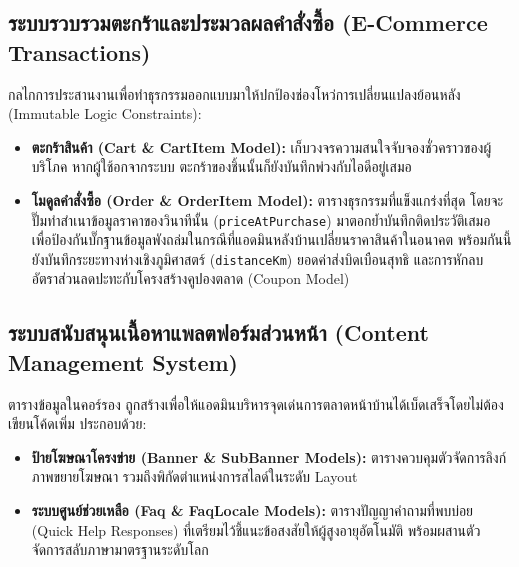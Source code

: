 \subsection{ระบบรวบรวมตะกร้าและประมวลผลคำสั่งซื้อ (E-Commerce Transactions)}
กลไกการประสานงานเพื่อทำธุรกรรมออกแบบมาให้ปกป้องช่องโหว่การเปลี่ยนแปลงย้อนหลัง (Immutable Logic Constraints):
\begin{itemize}
    \item \textbf{ตะกร้าสินค้า (Cart \& CartItem Model):} เก็บวงจรความสนใจจับจองชั่วคราวของผู้บริโภค หากผู้ใช้อกจากระบบ ตะกร้าของชิ้นนั้นก็ยังบันทึกพ่วงกับไอดีอยู่เสมอ
    \item \textbf{โมดูลคำสั่งซื้อ (Order \& OrderItem Model):} ตารางธุรกรรมที่แข็งแกร่งที่สุด โดยจะปั๊มทำสำเนาข้อมูลราคาของวินาทีนั้น (\texttt{priceAtPurchase}) มาตอกย้ำบันทึกติดประวัติเสมอ เพื่อป้องกันบั๊กฐานข้อมูลพังถล่มในกรณีที่แอดมินหลังบ้านเปลี่ยนราคาสินค้าในอนาคต พร้อมกันนี้ยังบันทึกระยะทางห่างเชิงภูมิศาสตร์ (\texttt{distanceKm}) ยอดค่าส่งบิดเบือนสุทธิ และการหักลบอัตราส่วนลดปะทะกับโครงสร้างคูปองตลาด (Coupon Model) 
\end{itemize}

\subsection{ระบบสนับสนุนเนื้อหาแพลตฟอร์มส่วนหน้า (Content Management System)}
ตารางข้อมูลในคอร์รอง ถูกสร้างเพื่อให้แอดมินบริหารจุดเด่นการตลาดหน้าบ้านได้เบ็ดเสร็จโดยไม่ต้องเขียนโค้ดเพิ่ม ประกอบด้วย:
\begin{itemize}
    \item \textbf{ป้ายโฆษณาโครงข่าย (Banner \& SubBanner Models):} ตารางควบคุมตัวจัดการลิงก์ภาพขยายโฆษณา รวมถึงพิกัดตำแหน่งการสไลด์ในระดับ Layout
    \item \textbf{ระบบศูนย์ช่วยเหลือ (Faq \& FaqLocale Models):} ตารางปัญญาคำถามที่พบบ่อย (Quick Help Responses) ที่เตรียมไว้ชี้แนะข้อสงสัยให้ผู้สูงอายุอัตโนมัติ พร้อมผสานตัวจัดการสลับภาษามาตรฐานระดับโลก
\end{itemize}

